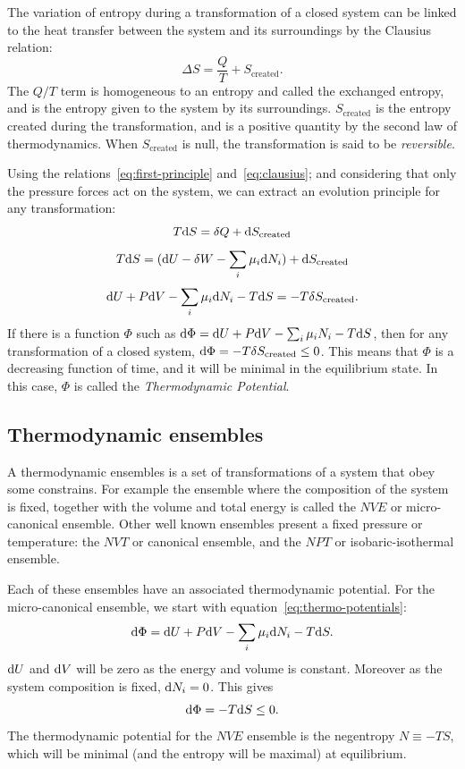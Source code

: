 \documentclass[thesis]{subfiles}
\begin{document}
The variation of entropy during a transformation of a closed system can be
linked to the heat transfer between the system and its surroundings by the
Clausius relation:
\[\Delta S = \frac Q T + S_\text{created}. \label{eq:clausius}\]
The $Q/T$ term is homogeneous to an entropy and called the exchanged entropy,
and is the entropy given to the system by its surroundings. $S_\text{created}$
is the entropy created during the transformation, and is a positive quantity by
the second law of thermodynamics. When $S_\text{created}$ is null, the
transformation is said to be \emph{reversible}.

Using the relations~\eqref{eq:first-principle} and~\eqref{eq:clausius}; and
considering that only the pressure forces act on the system, we can extract an
evolution principle for any transformation:
\[T \text{d} S = \delta Q + \text{d} S_\text{created}\]
\[T \text{d} S = (\text{d} U - \delta W - \sum_i \mu_i \text{d} N_i) + \text{d} S_\text{created}\]
\[\text{d} U + P \text{d} V  - \sum_i \mu_i \text{d} N_i - T \text{d} S = -T\delta S_\text{created}.\label{eq:thermo-potentials}\]
If there is a function $\Phi$ such as $\text{d} \Phi = \text{d} U + P \text{d} V - \sum_i \mu_i
N_i - T \text{d} S$, then for any transformation of a closed system, $\text{d} \Phi =
-T\delta S_\text{created} \leq 0$. This means that $\Phi$ is a decreasing
function of time, and it will be minimal in the equilibrium state. In this case,
$\Phi$ is called the \emph{Thermodynamic Potential}.

\subsection{Thermodynamic ensembles}

A thermodynamic ensembles is a set of transformations of a system that obey some
constrains. For example the ensemble where the composition of the system is
fixed, together with the volume and total energy is called the $NVE$ or
micro-canonical ensemble. Other well known ensembles present a fixed pressure or
temperature: the $NVT$ or canonical ensemble, and the $NPT$ or
isobaric-isothermal ensemble.

Each of these ensembles have an associated thermodynamic potential. For the
micro-canonical ensemble, we start with equation~\eqref{eq:thermo-potentials}:
\[\text{d} \Phi = \text{d} U + P \text{d} V - \sum_i \mu_i \text{d} N_i - T \text{d} S.\]
$\text{d} U$ and $\text{d} V$ will be zero as the energy and volume is constant. Moreover
as the system composition is fixed, $\text{d} N_i = 0$. This gives
\[\text{d} \Phi = - T \text{d} S \leq 0.\]
The thermodynamic potential for the $NVE$ ensemble is the negentropy $N \equiv
-TS$, which will be minimal (and the entropy will be maximal) at equilibrium.
\end{document}
